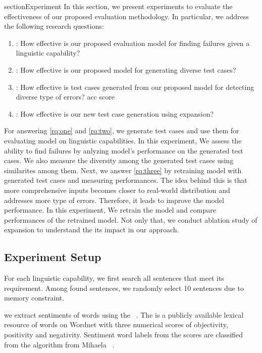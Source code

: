section{Experiment}
\label{sec:experiment}
%
In this section, we present experiments to evaluate the effectiveness
of our proposed evaluation methodology. In particular, we address the
following research questions:

\begin{enumerate}[label=\textbf{RQ\arabic*}]
\item \label{rq:one}: How effective is our proposed evaluation model
  for finding failures given a linguistic capability?
\item \label{rq:two}: How effective is our proposed model for
  generating diverse test cases? %
\item \label{rq:three}: How effective is test cases generated from our
  proposed model for detecting diverse type of errors? %
  acc score
\item \label{rq:four}: How effective is our new test case generation
  using \cfg expansion? %
\end{enumerate}

For answering \ref{rq:one} and \ref{rq:two}, we generate test cases
and use them for evaluating model on linguistic capabilities. In this
experiment, We assess the ability to find failures by anlyzing model's
performance on the generated test cases. We also measure the diversity
among the generated test cases using similarites among them. Next, we
answer \ref{rq:three} by retraining \sa model with generated test
cases and measuring performances. The idea behind this is that more
comprehensive inputs becomes closer to real-world distribution and
addresses more type of errors.  Therefore, it leads to improve the
model performance. In this experiment, We retrain the model and
compare performances of the retrained model. Not only that, we conduct
ablation study of \cfg expansion to understand the its impact in our
approach.

\subsection{Experiment Setup}
%
%
For each linguistic capability, we first search all sentences that
meet its requirement. Among found sentences, we randomly select 10
sentences due to memory constraint.

%
we extract sentiments of words using the
\Swn~\cite{baccianella2010sentiwordnet}. The \Swn is a publicly
available lexical resource of words on Wordnet with three numerical
scores of objectivity, positivity and negativity. Sentiment word
labels from the scores are classified from the algorithm from Mihaela
\etal~\cite{mihaela2017sentiwordnetlabel}.

